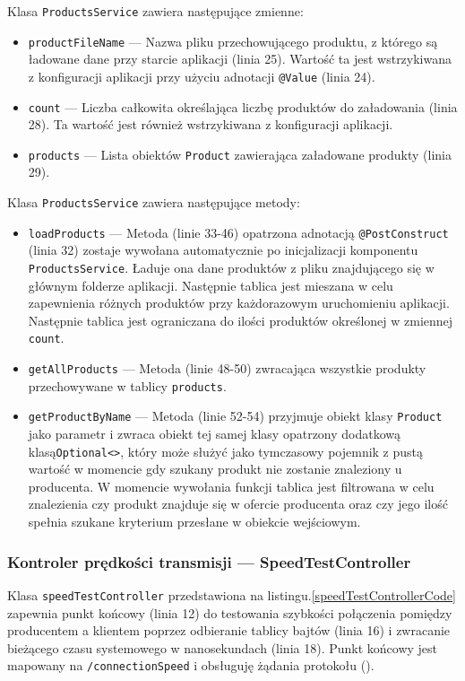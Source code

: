 Klasa \verb|ProductsService| zawiera następujące zmienne:
\begin{itemize}
    \item \verb|productFileName| --- Nazwa pliku przechowującego produktu, z którego są ładowane dane przy starcie aplikacji (linia 25). Wartość ta jest wstrzykiwana z konfiguracji aplikacji przy użyciu adnotacji \verb|@Value| (linia 24).
    \item \verb|count| ---  Liczba całkowita określająca liczbę produktów do załadowania (linia 28). Ta wartość jest również wstrzykiwana z konfiguracji aplikacji.
    \item \verb|products| --- Lista obiektów \verb|Product| zawierająca załadowane produkty (linia 29).
\end{itemize}

Klasa \verb|ProductsService| zawiera następujące metody:
\begin{itemize}
    \item \verb|loadProducts| --- Metoda (linie 33-46) opatrzona adnotacją \verb|@PostConstruct| (linia 32) zostaje wywołana automatycznie po inicjalizacji komponentu \verb|ProductsService|. Ładuje ona dane produktów z pliku znajdującego się w głównym folderze aplikacji. Następnie tablica jest mieszana w celu zapewnienia różnych produktów przy każdorazowym uruchomieniu aplikacji. Następnie tablica jest ograniczana do ilości produktów określonej w zmiennej \verb|count|.
    \item \verb|getAllProducts| --- Metoda (linie 48-50) zwracająca wszystkie produkty przechowywane w tablicy \verb|products|.
    \item \verb|getProductByName| --- Metoda (linie 52-54)  przyjmuje obiekt klasy \verb|Product| jako parametr i zwraca obiekt tej samej klasy opatrzony dodatkową klasą\verb|Optional<>|, który może służyć jako tymczasowy pojemnik z pustą wartość w momencie gdy szukany produkt nie zostanie znaleziony u producenta. W momencie wywołania funkcji tablica jest filtrowana w celu znalezienia czy produkt znajduje się w ofercie producenta oraz czy jego ilość spełnia szukane kryterium przesłane w obiekcie wejściowym.
\end{itemize}

\subsubsection{Kontroler prędkości transmisji --- SpeedTestController}

Klasa \verb|speedTestController| przedstawiona na listingu.\ref{speedTestControllerCode} zapewnia punkt końcowy (linia 12) do testowania szybkości połączenia pomiędzy producentem a klientem poprzez odbieranie tablicy bajtów (linia 16) i zwracanie bieżącego czasu systemowego w nanosekundach (linia 18). Punkt końcowy jest mapowany na \verb|/connectionSpeed| i obsługuję żądania  protokołu  ().

